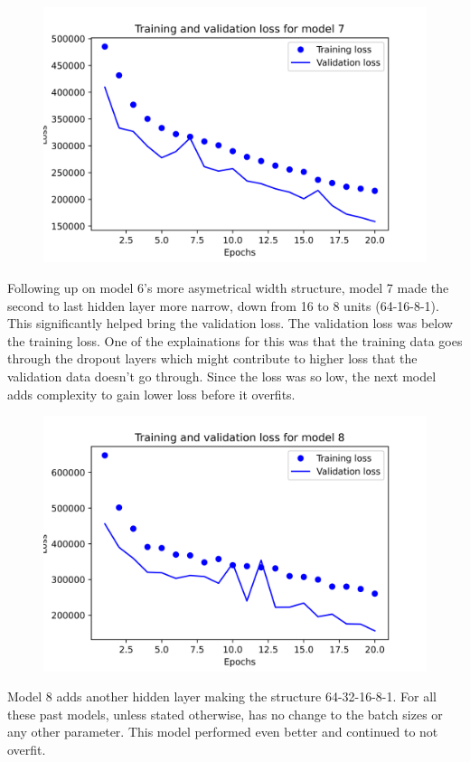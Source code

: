 \documentclass{article}
\begin{document}
    \begin{figure}[H]
        \includegraphics[width=\linewidth]{images/model7.png}
    \end{figure}
    Following up on model 6's more asymetrical width structure, model 7 made the second to last hidden layer more narrow, down from 16 to 8 units 
    (64-16-8-1). This significantly helped bring the validation loss. The validation loss was below the training loss. One of the explainations 
    for this was that the training data goes through the dropout layers which might contribute to higher loss that the validation data doesn't go 
    through. Since the loss was so low, the next model adds complexity to gain lower loss before it overfits.

    \begin{figure}[H]
        \includegraphics[width=\linewidth]{images/model8.png}
    \end{figure}
    Model 8 adds another hidden layer making the structure 64-32-16-8-1. For all these past models, unless stated otherwise, has no 
    change to the batch sizes or any other parameter. This model performed even better and continued to not overfit.
\end{document}
